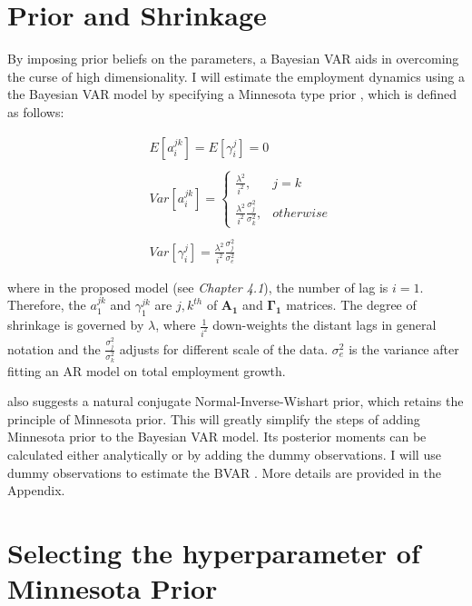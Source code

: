 \documentclass{monashthesis}
\begin{document}
\hypertarget{prior-and-shrinkage}{%
\section{Prior and Shrinkage}\label{prior-and-shrinkage}}

By imposing prior beliefs on the parameters, a Bayesian VAR aids in overcoming the curse of high dimensionality\autocite{banbura2010large}. I will estimate the employment dynamics using a the Bayesian VAR model by specifying a Minnesota type prior \autocites[e.g.][]{anderson2020,litterman1986,robertson1999vector}, which is defined as follows:

\[
\begin{aligned}\label{eq:1}
&E[a_{i}^{jk}] = E[\gamma_{i}^j]=0\\
\\
&Var[a_i^{jk}]= 
\begin{cases}
\frac{\lambda^2}{i^2},&j=k\\
\frac{\lambda^2}{i^2}\frac{\sigma^2_{j}}{\sigma^2_k},& otherwise
\end{cases}\\
\\
&Var[\gamma_i^{j}]=\frac{\lambda^2}{i^2}\frac{\sigma^2_{j}}{\sigma^2_e}
\end{aligned}
\]

where in the proposed model (see \emph{Chapter 4.1}), the number of lag is \(i=1\). Therefore, the \(a_{1}^{jk}\) and \(\gamma_{1}^{jk}\) are \({j,k}^{th}\) of \(\bm{A_1}\) and \(\bm{\Gamma_1}\) matrices. The degree of shrinkage is governed by \(\lambda\), where \(\frac{1}{i^2}\) down-weights the distant lags in general notation and the \(\frac{\sigma_j^2}{\sigma_k^2}\) adjusts for different scale of the data. \(\sigma^2_e\) is the variance after fitting an AR model on total employment growth.

\textcite{banbura2010large} also suggests a natural conjugate Normal-Inverse-Wishart prior, which retains the principle of Minnesota prior. This will greatly simplify the steps of adding Minnesota prior to the Bayesian VAR model. Its posterior moments can be calculated either analytically or by adding the dummy observations. I will use dummy observations to estimate the BVAR \autocite{banbura2010large}. More details are provided in the Appendix.

\hypertarget{selecting-the-hyperparameter-of-minnesota-prior}{%
\section{Selecting the hyperparameter of Minnesota Prior}\label{selecting-the-hyperparameter-of-minnesota-prior}}
\end{document}
